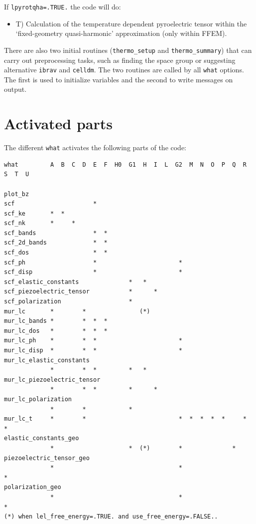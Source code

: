 \documentclass[12pt,a4paper,twoside]{report}
\begin{document}
If \texttt{lpyrotqha=.TRUE.} the code will do:
\begin{itemize}
\item
T) Calculation of the temperature dependent pyroelectric tensor within the
`fixed-geometry quasi-harmonic' approximation (only within FFEM).
\end{itemize}

There are also two initial routines (\texttt{thermo\_setup} and 
\texttt{thermo\_summary}) that can carry out preprocessing tasks, such as 
finding the space group or suggesting alternative \texttt{ibrav} and 
\texttt{celldm}. The two routines are called by all \texttt{what} options.
The first is used to initialize variables and the second to write messages 
on output.

\newpage

{\color{dark-blue}\chapter{Activated parts}}
\color{black}

The different \texttt{what} activates the following parts of the code:

\begin{footnotesize}
\begin{verbatim}
what         A  B  C  D  E  F  H0  G1  H  I  L  G2  M  N  O  P  Q  R  S  T  U

plot_bz
scf                      *
scf_ke       *  *
scf_nk       *     *
scf_bands                *  *
scf_2d_bands             *  *
scf_dos                  *  *
scf_ph                   *                       *
scf_disp                 *                       *
scf_elastic_constants              *   *
scf_piezoelectric_tensor           *      *      
scf_polarization                   *  
mur_lc       *        *               (*)
mur_lc_bands *        *  *  *
mur_lc_dos   *        *  *  *
mur_lc_ph    *        *  *                       *
mur_lc_disp  *        *  *                       *
mur_lc_elastic_constants
             *        *  *         *   *
mur_lc_piezoelectric_tensor
             *        *  *         *      *    
mur_lc_polarization
             *        *            *               
mur_lc_t     *        *                          *  *  *  *  *     *  *
elastic_constants_geo
             *                     *  (*)        *              *  
piezoelectric_tensor_geo
             *                                   *                       *
polarization_geo
             *                                   *                          *
(*) when lel_free_energy=.TRUE. and use_free_energy=.FALSE.. 
\end{verbatim}
\end{footnotesize}
\end{document}
